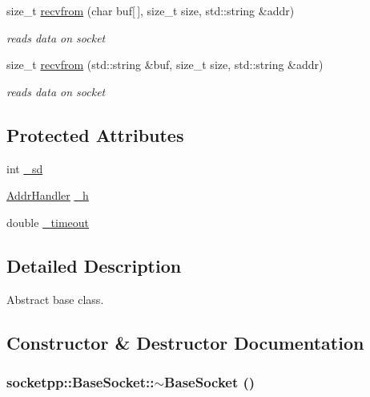 \begin{CompactItemize}
size\_\-t \hyperlink{classsocketpp_1_1BaseSocket_c7a79cd90b082806dcafb14fbbd130b8}{recvfrom} (char buf\mbox{[}$\,$\mbox{]}, size\_\-t size, std::string \&addr)
\begin{CompactList}\small\item\em reads data on socket \item\end{CompactList}\item 
size\_\-t \hyperlink{classsocketpp_1_1BaseSocket_ace82407e13a6eee26aa1f5f642d0cfc}{recvfrom} (std::string \&buf, size\_\-t size, std::string \&addr)
\begin{CompactList}\small\item\em reads data on socket \item\end{CompactList}\end{CompactItemize}
\subsection*{Protected Attributes}
\begin{CompactItemize}
\item 
int \hyperlink{classsocketpp_1_1BaseSocket_a5ef6b5fabb3988bced6a23d9631985d}{\_\-sd}
\item 
\hyperlink{classsocketpp_1_1AddrHandler}{AddrHandler} \hyperlink{classsocketpp_1_1BaseSocket_1e44e3c6c2ecd89c2aa716cc62528620}{\_\-h}
\item 
double \hyperlink{classsocketpp_1_1BaseSocket_418af5a1fe752cef38e4c6679780224c}{\_\-timeout}
\end{CompactItemize}


\subsection{Detailed Description}
Abstract base class. 

\subsection{Constructor \& Destructor Documentation}
\hypertarget{classsocketpp_1_1BaseSocket_2e066addfaa6f5648e68b3e6b0a15e79}{
\subsubsection[{$\sim$BaseSocket}]{\setlength{\rightskip}{0pt plus 5cm}socketpp::BaseSocket::$\sim$BaseSocket ()}}
\label{classsocketpp_1_1BaseSocket_2e066addfaa6f5648e68b3e6b0a15e79}


